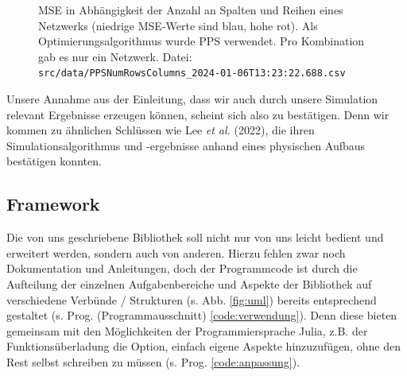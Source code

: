 \documentclass[10pt]{scrartcl}
\newcommand{\filepath}[1]{\texttt{#1}}
\newcommand{\lee}{Lee {\itshape et al.} (2022)}
\begin{document}
\begin{figure}[H]
    \centering
    \Data
    \caption{MSE in Abhängigkeit der Anzahl an Spalten und Reihen eines Netzwerks (niedrige MSE-Werte sind blau, hohe rot). Als Optimierungsalgorithmus wurde PPS verwendet. Pro Kombination gab es nur ein Netzwerk. Datei: \filepath{src/data/PPSNumRowsColumns\_2024-01-06T13:23:22.688.csv}}
    \label{fig:ppsrowscols}
\end{figure}

Unsere Annahme aus der Einleitung, dass wir auch durch unsere Simulation relevant Ergebnisse erzeugen können, scheint sich also zu bestätigen.
Denn wir kommen zu ähnlichen Schlüssen wie \lee{}, die ihren Simulationsalgorithmus und -ergebnisse anhand eines physischen Aufbaus bestätigen konnten.




\subsection{Framework}

Die von uns geschriebene Bibliothek \cite{RepoMNN} soll nicht nur von uns leicht bedient und erweitert werden, sondern auch von anderen.
Hierzu fehlen zwar noch Dokumentation und Anleitungen, doch der Programmcode ist durch die Aufteilung der einzelnen Aufgabenbereiche und Aspekte der Bibliothek auf verschiedene Verbünde / Strukturen (s. Abb. \ref{fig:uml}) bereits entsprechend gestaltet (s. Prog. (Programmausschnitt) \ref{code:verwendung}).
Denn diese bieten gemeinsam mit den Möglichkeiten der Programmiersprache Julia, z.B.
der Funktionsüberladung die Option, einfach eigene Aspekte hinzuzufügen, ohne den Rest selbst schreiben zu müssen (s. Prog. \ref{code:anpassung}).
\end{document}
